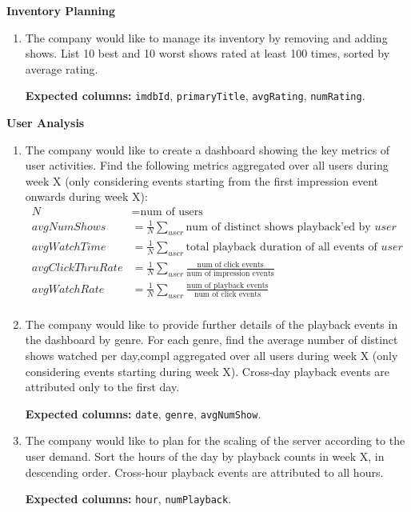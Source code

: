\documentclass[10pt,titlepage]{article}
\begin{document}
\textbf{Inventory Planning}
\begin{enumerate}[resume]
    \item The company would like to manage its inventory by removing and adding shows. List 10 best and 10 worst shows
        rated at least 100 times, sorted by average rating.

        \textbf{Expected columns:} \texttt{imdbId}, \texttt{primaryTitle}, \texttt{avgRating}, \texttt{numRating}.
\end{enumerate}

\textbf{User Analysis}
\begin{enumerate}[resume]
    \item The company would like to create a dashboard showing the key metrics of user activities. Find the following
        metrics aggregated over all users during week X (only considering events starting from the first impression
        event onwards during week X):
        \begin{align*}
            N &= \text{num of users} \\
            avgNumShows &= \frac{1}{N}\sum_{user} \text{num of distinct shows playback'ed by } user \\
            avgWatchTime &= \frac{1}{N}\sum_{user} \text{total playback duration of all events of } user \\
            avgClickThruRate &= \frac{1}{N}\sum_{user} \frac{\text{num of click events}}{\text{num of impression events}} \\
            avgWatchRate &= \frac{1}{N}\sum_{user} \frac{\text{num of playback events}}{\text{num of click events}} \\
        \end{align*}

    \item The company would like to provide further details of the playback events in the dashboard by genre. For each
        genre, find the average number of distinct shows watched per day,compl aggregated over all users during week X
        (only considering events starting during week X). Cross-day playback events are attributed only to the first
        day.

        \textbf{Expected columns:} \texttt{date}, \texttt{genre}, \texttt{avgNumShow}.

    \item The company would like to plan for the scaling of the server according to the user demand. Sort the hours of
        the day by playback counts in week X, in descending order. Cross-hour playback events are attributed to all
        hours.

        \textbf{Expected columns:} \texttt{hour}, \texttt{numPlayback}.
\end{enumerate}
\end{document}
